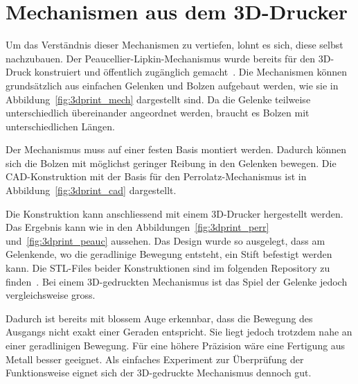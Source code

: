 %
%
%
%
\section{Mechanismen aus dem 3D-Drucker
\label{geradlinig:section:mechanismen_aus_dem_3d_drucker}}
Um das Verständnis dieser Mechanismen zu vertiefen, lohnt es sich,
diese selbst nachzubauen.
Der Peaucellier-Lipkin-Mechanismus wurde bereits 
für den 3D-Druck konstruiert und öffentlich 
zugänglich gemacht~\cite{thingiverse}.
Die Mechanismen können grundsätzlich aus einfachen Gelenken und Bolzen 
aufgebaut werden, wie sie in Abbildung~\ref{fig:3dprint_mech} 
dargestellt sind.
Da die Gelenke teilweise unterschiedlich übereinander angeordnet werden, 
braucht es Bolzen mit unterschiedlichen Längen.


Der Mechanismus muss auf einer festen Basis montiert werden.
Dadurch können sich die Bolzen mit möglichst geringer Reibung 
in den Gelenken bewegen.
Die CAD-Kon\-struk\-tion mit der Basis für den Perrolatz-Mechanismus 
ist in Abbildung~\ref{fig:3dprint_cad} dargestellt.


Die Konstruktion kann anschliessend mit einem 3D-Drucker hergestellt werden.
Das Ergebnis kann wie in den Abbildungen~\ref{fig:3dprint_perr} 
und~\ref{fig:3dprint_peauc} aussehen.
Das Design wurde so ausgelegt, dass am Gelenkende, wo die 
geradlinige Bewegung entsteht, ein Stift befestigt werden kann.
Die STL-Files beider Konstruktionen sind im 
folgenden Repository zu finden~\cite{github_stl_mechanism}.
Bei einem 3D-gedruckten Mechanismus ist das Spiel der Gelenke 
jedoch vergleichsweise gross.

Dadurch ist bereits mit blossem Auge erkennbar, dass die Bewegung 
des Ausgangs nicht exakt einer Geraden entspricht.
Sie liegt jedoch trotzdem nahe an einer geradlinigen Bewegung.
Für eine höhere Präzision wäre eine Fertigung aus Metall besser geeignet.
Als einfaches Experiment zur Überprüfung der Funktionsweise eignet 
sich der 3D-gedruckte Mechanismus dennoch gut.

